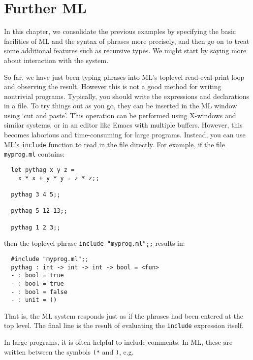 \chapter{Further ML}

In this chapter, we consolidate the previous examples by specifying the basic
facilities of ML and the syntax of phrases more precisely, and then go on to
treat some additional features such as recursive types. We might start by
saying more about interaction with the system.

So far, we have just been typing phrases into ML's toplevel read-eval-print
loop and observing the result. However this is not a good method for writing
nontrivial programs. Typically, you should write the expressions and
declarations in a file. To try things out as you go, they can be inserted in
the ML window using `cut and paste'. This operation can be performed using
X-windows and similar systems, or in an editor like Emacs with multiple
buffers. However, this becomes laborious and time-consuming for large programs.
Instead, you can use ML's {\tt include} function to read in the file directly.
For example, if the file {\tt myprog.ml} contains:

\begin{boxed}\begin{verbatim}
  let pythag x y z =
    x * x + y * y = z * z;;

  pythag 3 4 5;;

  pythag 5 12 13;;

  pythag 1 2 3;;
\end{verbatim}\end{boxed}

\noindent then the toplevel phrase {\tt include "myprog.ml";;} results in:

\begin{boxed}\begin{verbatim}
  #include "myprog.ml";;
  pythag : int -> int -> int -> bool = <fun>
  - : bool = true
  - : bool = true
  - : bool = false
  - : unit = ()
\end{verbatim}\end{boxed}

That is, the ML system responds just as if the phrases had been entered at the
top level. The final line is the result of evaluating the {\tt include}
expression itself.

In large programs, it is often helpful to include comments. In ML, these are
written between the symbols {\tt (*} and {\tt *)}, e.g.


